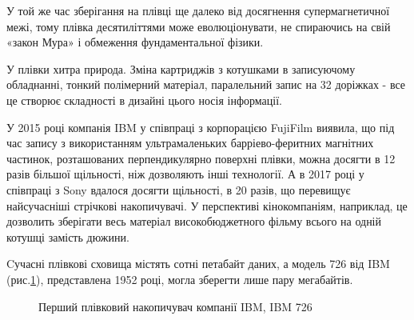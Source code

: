 \documentclass[a4paper,14pt]{extreport}
\begin{document}
У той же час зберігання на плівці ще далеко від досягнення супермагнетичної межі, тому плівка десятиліттями може еволюціонувати, не спираючись на свій «закон Мура» і обмеження фундаментальної фізики.\par

У плівки хитра природа. Зміна картриджів з котушками в записуючому обладнанні, тонкий полімерний матеріал, паралельний запис на 32 доріжках - все це створює складності в дизайні цього носія інформації.\par

У 2015 році компанія IBM у співпраці з корпорацією FujiFilm виявила, що під час запису з використанням ультрамаленьких барріево-феритних магнітних частинок, розташованих перпендикулярно поверхні плівки, можна досягти в 12 разів більшої щільності, ніж дозволяють інші технології. А в 2017 році у співпраці з Sony вдалося досягти щільності, в 20 разів, що перевищує найсучасніші стрічкові накопичувачі. У перспективі кінокомпаніям, наприклад, це дозволить зберігати весь матеріал високобюджетного фільму всього на одній котушці замість дюжини.\par

Cучасні плівкові сховища містять сотні петабайт даних, а модель 726 від IBM (рис.\ref{ris4}), представлена 1952 році, могла зберегти лише пару мегабайтів.

  \begin{figure}[h]
    \caption{Перший плівковий накопичувач компанії IBM, IBM 726}
    \label{ris4}
  \end{figure}
\end{document}
